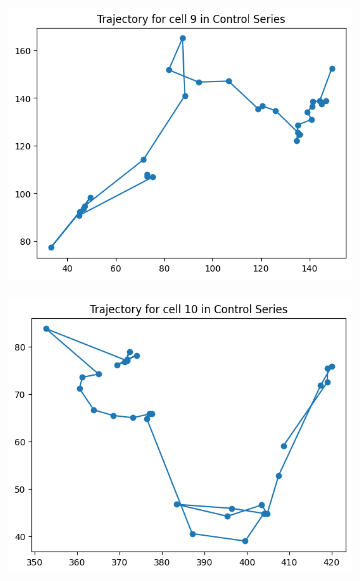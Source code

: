 \documentclass{article}
\begin{document}
\begin{figure}[h!]
    \centering
    \begin{subfigure}[b]{0.5\linewidth}
        \centering
        \includegraphics[width=\linewidth]{Report/Appendix_Images/Trajectory-A-Control/trajectory_9.png}
        \caption{}
    \end{subfigure}%
    \begin{subfigure}[b]{0.5\linewidth}
        \centering
        \includegraphics[width=\linewidth]{Report/Appendix_Images/Trajectory-A-Control/trajectory_10.png}
        \caption{}
    \end{subfigure}

\end{figure}
\end{document}
